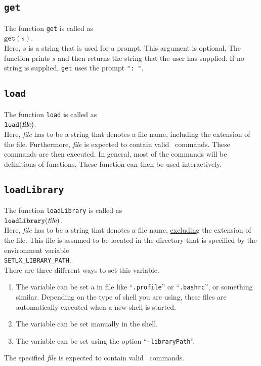 \subsection{\texttt{get}}
The function \texttt{get}  is called as
\\[0.2cm]
\hspace*{1.3cm}
$\mathtt{get}(s)$.
\\[0.2cm]
Here, $s$ is a string that is used for a prompt. This argument is optional.  The function prints $s$ and then
returns the string that the user has supplied.  If no string is supplied, \texttt{get}
uses the prompt \texttt{": "}.

\subsection{\texttt{load}}
The function \texttt{load}  is called as
\\[0.2cm]
\hspace*{1.3cm}
$\mathtt{load}(\textsl{file})$.
\\[0.2cm]
Here, \textsl{file} has to be a string that denotes a file name, including  the extension
of the file.  Furthermore, \textsl{file} is expected to contain valid \setlx\ commands.
These commands are then executed.  In general, most of the commands will be definitions of
functions.  These function can then be used interactively.

\subsection{\texttt{loadLibrary}}
The function \texttt{loadLibrary}  is called as
\\[0.2cm]
\hspace*{1.3cm}
$\mathtt{loadLibrary}(\textsl{file})$.
\\[0.2cm]
Here, \textsl{file} has to be a string that denotes a file name, \underline{excludin}g the extension
of the file.  This file is assumed to be located in the directory that is specified by the
environment variable 
\\[0.2cm]
\hspace*{1.3cm}
\texttt{SETLX\_LIBRARY\_PATH}.
\\[0.2cm]
There are three different ways to set this variable.
\begin{enumerate}
\item The variable can be  set a in file like ``\texttt{.profile}'' or
      ``\texttt{.bashrc}'', or something similar.  Depending on the type of shell you are
      using, these files are automatically executed when a new shell is started.
\item The variable can be set manually in the shell.
\item The variable can be set using the option ``\texttt{--libraryPath}''.
\end{enumerate}
The specified \textsl{file} is expected to contain valid \setlx\ commands.

